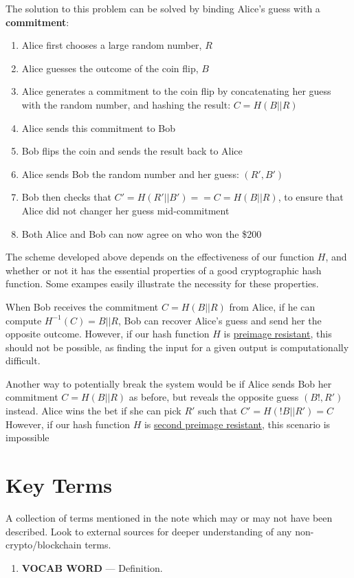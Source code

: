 \documentclass[11pt]{article}
\begin{document}
    The solution to this problem can be solved by binding Alice's guess with a \textbf{commitment}:
    
    \begin{enumerate}
        \item Alice first chooses a large random number, $R$
        \item Alice guesses the outcome of the coin flip, $B$
        \item Alice generates a commitment to the coin flip by concatenating her guess with the random number, and hashing the result: $C = H(B||R)$
        \item Alice sends this commitment to Bob
        \item Bob flips the coin and sends the result back to Alice
        \item Alice sends Bob the random number and her guess: $(R', B')$
        \item Bob then checks that $C' = H(R'||B')==C=H(B||R)$, to ensure that Alice did not changer her guess mid-commitment
        \item Both Alice and Bob can now agree on who won the \$200
    \end{enumerate}
    
    The scheme developed above depends on the effectiveness of our function $H$, and whether or not it has the essential properties of a good cryptographic hash function. Some exampes easily illustrate the necessity for these properties.
    
    When Bob receives the commitment $C=H(B||R)$ from Alice, if he can compute $H^{-1}(C) = B||R$, Bob can recover Alice's guess and send her the opposite outcome. However, if our hash function $H$ is \underline{preimage resistant}, this should not be possible, as finding the input for a given output is computationally difficult.
    
    Another way to potentially break the system would be if Alice sends Bob her commitment $C=H(B||R)$ as before, but reveals the opposite guess $(B!,R')$ instead. Alice wins the bet if she can pick $R'$ such that $C'=H(!B||R') = C$ However, if our hash function $H$ is \underline{second preimage resistant}, this scenario is impossible
    
    
    

    \newpage
    \thispagestyle{firstpage}
    \vspace*{2\baselineskip}
    \section*{Key Terms}
    \noindent A collection of terms mentioned in the note which may or may not have been described. Look to external sources for deeper understanding of any non-crypto/blockchain terms.
    \begin{enumerate}
        \item \textbf{VOCAB WORD} --- Definition. %
    \end{enumerate}
\end{document}
